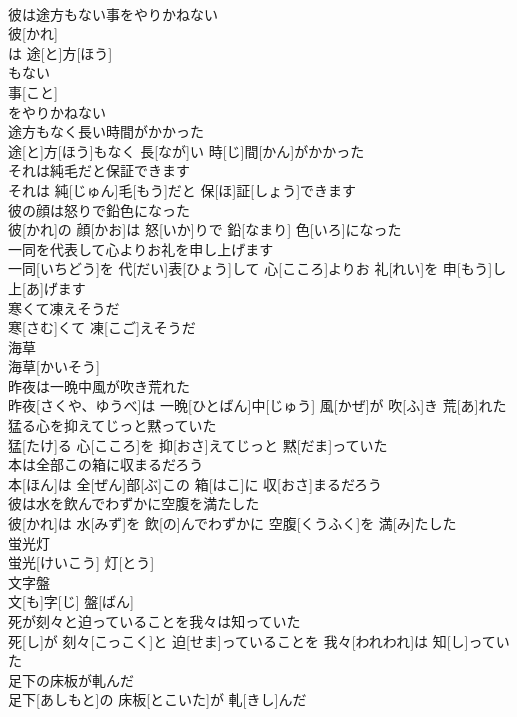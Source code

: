\documentclass[8pt]{extreport}
\begin{document}
\begin{CJK}{UTF8}{min}
\\	彼は途方もない事をやりかねない	
\\	彼[かれ]
\\	は 途[と]方[ほう]
\\	もない 
\\	事[こと]
\\	をやりかねない
\\	途方もなく長い時間がかかった	
\\	途[と]方[ほう]もなく 長[なが]い 時[じ]間[かん]がかかった
\\	それは純毛だと保証できます	
\\	それは 純[じゅん]毛[もう]だと 保[ほ]証[しょう]できます
\\	彼の顔は怒りで鉛色になった	
\\	彼[かれ]の 顔[かお]は 怒[いか]りで 鉛[なまり] 色[いろ]になった
\\	一同を代表して心よりお礼を申し上げます	
\\	一同[いちどう]を 代[だい]表[ひょう]して 心[こころ]よりお 礼[れい]を 申[もう]し 上[あ]げます
\\	寒くて凍えそうだ	
\\	寒[さむ]くて 凍[こご]えそうだ
\\	海草	
\\	海草[かいそう]
\\	昨夜は一晩中風が吹き荒れた	
\\	昨夜[さくや、ゆうべ]は 一晩[ひとばん]中[じゅう] 風[かぜ]が 吹[ふ]き 荒[あ]れた
\\	猛る心を抑えてじっと黙っていた	
\\	猛[たけ]る 心[こころ]を 抑[おさ]えてじっと 黙[だま]っていた
\\	本は全部この箱に収まるだろう	
\\	本[ほん]は 全[ぜん]部[ぶ]この 箱[はこ]に 収[おさ]まるだろう
\\	彼は水を飲んでわずかに空腹を満たした	
\\	彼[かれ]は 水[みず]を 飲[の]んでわずかに 空腹[くうふく]を 満[み]たした
\\	蛍光灯	
\\	蛍光[けいこう] 灯[とう]
\\	文字盤	
\\	文[も]字[じ] 盤[ばん]
\\	死が刻々と迫っていることを我々は知っていた	
\\	死[し]が 刻々[こっこく]と 迫[せま]っていることを 我々[われわれ]は 知[し]っていた
\\	足下の床板が軋んだ	
\\	足下[あしもと]の 床板[とこいた]が 軋[きし]んだ

\end{CJK}
\end{document}
